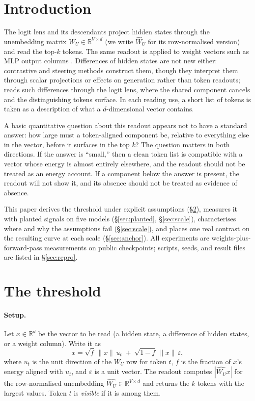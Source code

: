 \documentclass[11pt]{article}
\newcommand{\WU}{W_U}
\begin{document}
\section{Introduction}

The logit lens \citep{nostalgebraist2020} and its descendants project
hidden states through the unembedding matrix $\WU \in
\mathbb{R}^{V\times d}$ (we write $\hat{\WU}$ for its row-normalised
version) and read the top-$k$ tokens. The same readout is applied to
weight vectors such as MLP output columns \citep{geva2022,dar2022}.
Differences of hidden states are not new either: contrastive and
steering methods \citep{zou2023,turner2023,rimsky2024} construct them,
though they interpret them through scalar projections or effects on
generation rather than token readouts; \citet{tuomi2026contrastive}
reads such differences through the logit lens, where the shared
component cancels and the distinguishing tokens surface. In each
reading use, a short list of tokens is taken as a description of what
a $d$-dimensional vector contains.

A basic quantitative question about this readout appears not to have
a standard answer: how large must a token-aligned component be,
relative to everything else in the vector, before it surfaces in the
top $k$? The question matters in both directions. If the answer is
``small,'' then a clean token list is compatible with a vector whose
energy is almost entirely elsewhere, and the readout should not be
treated as an energy account. If a component below the answer is
present, the readout will not show it, and its absence should not be
treated as evidence of absence.

This paper derives the threshold under explicit assumptions
(\S\ref{sec:threshold}), measures it with planted signals on five
models (\S\ref{sec:planted}, \S\ref{sec:scale}), characterises where
and why the assumptions fail (\S\ref{sec:scale}), and places one real
contrast on the resulting curve at each scale (\S\ref{sec:anchor}).
All experiments are weights-plus-forward-pass measurements on public
checkpoints; scripts, seeds, and result files are listed in
\S\ref{sec:repro}.

\section{The threshold}
\label{sec:threshold}

\paragraph{Setup.} Let $x \in \mathbb{R}^d$ be the vector to be read
(a hidden state, a difference of hidden states, or a weight column).
Write it as
\[
x = \sqrt{f}\,\|x\|\,u_t \;+\; \sqrt{1-f}\,\|x\|\,\varepsilon,
\]
where $u_t$ is the unit direction of the $\WU$ row for token $t$, $f$
is the fraction of $x$'s energy aligned with $u_t$, and $\varepsilon$
is a unit vector. The readout computes $|\hat{\WU} x|$ for the
row-normalised unembedding $\hat{\WU} \in \mathbb{R}^{V\times d}$ and
returns the $k$ tokens with the largest values. Token $t$ is
\emph{visible} if it is among them.
\end{document}
